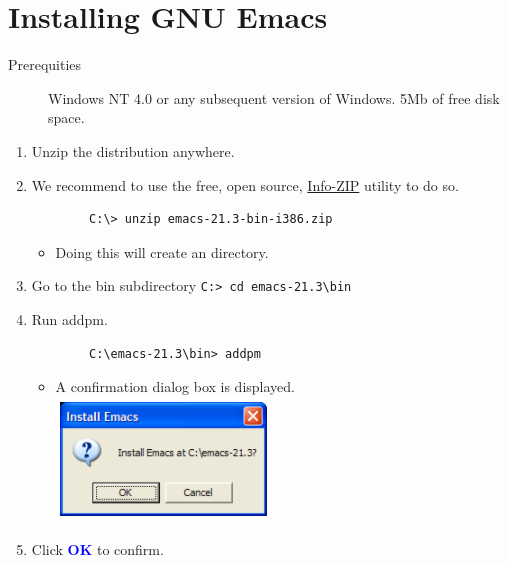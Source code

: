 \documentclass{article}
\newcommand{\uicontrol}[1]{\textcolor{blue}{\textbf{#1}}}
\begin{document}
\section*{Installing GNU Emacs}
\begin{description}
	\item[Prerequities] Windows NT 4.0 or any subsequent version of Windows. 5Mb of free
	disk space.
\end{description}
\begin{enumerate}
	\item Unzip the distribution anywhere.
	\item We recommend to use the free, open source, \href{http://www.info-zip.org/}{Info-ZIP}
	utility to do so.
	\begin{verbatim}
		C:\> unzip emacs-21.3-bin-i386.zip
	\end{verbatim}
	\begin{itemize}
		\item Doing this will create an  directory.
	\end{itemize}
	\item Go to the bin subdirectory \verb|C:> cd emacs-21.3\bin|
	\item Run addpm.
	\begin{verbatim}
		C:\emacs-21.3\bin> addpm
	\end{verbatim}
	\begin{itemize}
		\item A confirmation dialog box is displayed.\\
		\includegraphics{confirm-install-emacs}
	\end{itemize}
	\item Click \uicontrol{OK} to confirm.
\end{enumerate}
\end{document}
